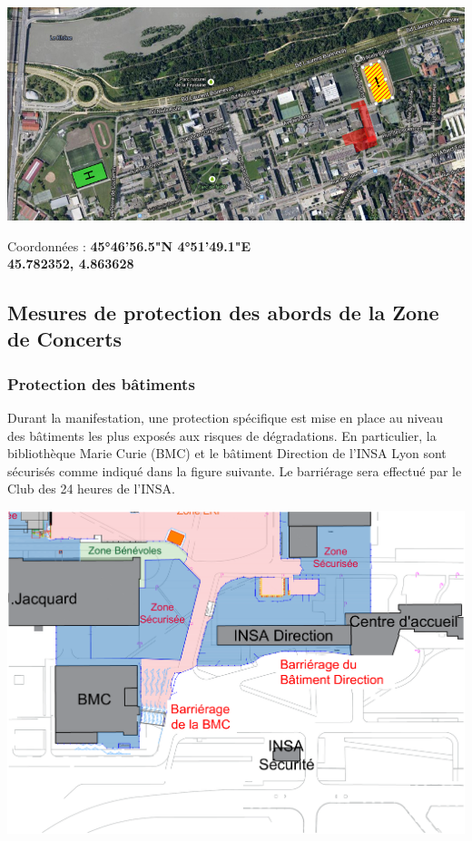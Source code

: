 \documentclass[hidelinks, paper=a4, fontsize=13pt]{report}
\begin{document}
\begin{center}
	\includegraphics[scale=0.4]{Annexes/Plans/dropZoneDimanche}
\end{center}


\begin{center}
	Coordonnées : \textbf{45°46'56.5"N 4°51'49.1"E}\\
	\textbf{45.782352, 4.863628}
\end{center}
\newpage

\subsection{Mesures de protection des abords de la Zone de Concerts}
\subsubsection{Protection des bâtiments} 
Durant la manifestation, une protection spécifique est mise en place au niveau des bâtiments les plus exposés aux risques de dégradations. En particulier, la bibliothèque Marie Curie (BMC) et le bâtiment Direction de l'INSA Lyon sont sécurisés comme indiqué dans la figure suivante. Le barriérage sera effectué par le Club des 24 heures de l'INSA.

\begin{center}
	\includegraphics[width=.8\textwidth,keepaspectratio]{Exports/Plan_24h_44eme-Protection_Bat}
\end{center}
\end{document}
